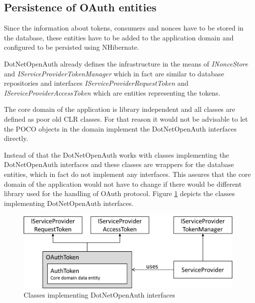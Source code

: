 \subsection{Persistence of OAuth entities}
Since the information about tokens, consumers and nonces have to be stored in the database, these entities have to be added to the application domain and configured to be persisted using NHibernate. 

DotNetOpenAuth already defines the infrastructure in the means of \textit{INonceStore} and \textit{IServiceProviderTokenManager} which in fact are similar to database repositories and interfaces \textit{IServiceProviderRequestToken} and \textit{IServiceProviderAccessToken} which are entities representing the tokens.

The core domain of the application is library independent and all classes are defined as poor old CLR classes. For that reason it would not be advisable to let the POCO objects in the domain implement the DotNetOpenAuth interfaces directly.

Instead of that the DotNetOpenAuth works with classes implementing the DotNetOpenAuth interfaces and these classes are wrappers for the database entities, which in fact do not implement any interfaces. This assures that the core domain of the application would not have to change if there would be different library used for the handling of OAuth protocol. Figure \ref{fig:oauth_wrapping} depicts the classes implementing DotNetOpenAuth interfaces.

\begin{figure}[h]
\begin{center}
\includegraphics[width=14cm]{figures/oauth_wrapping}
\caption{Classes implementing DotNetOpenAuth interfaces}
\label{fig:oauth_wrapping}
\end{center}
\end{figure}